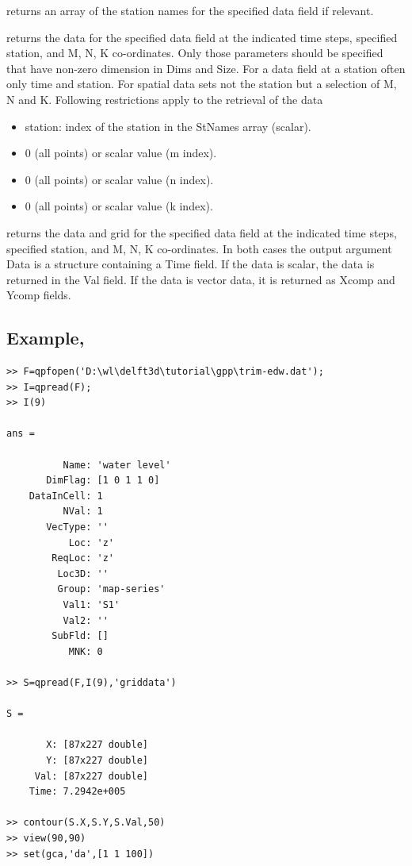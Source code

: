  returns an array of the station names for the specified data field if relevant.

 returns the data for the specified data field at the indicated time steps, specified station, and M, N, K co-ordinates.
Only those parameters should be specified that have non-zero dimension in Dims and Size.
For a data field at a station often only time and station.
For spatial data sets not the station but a selection of M, N and K.
Following restrictions apply to the retrieval of the data

\begin{itemize}
\item station: index of the station in the StNames array (scalar).
\item 0 (all points) or scalar value (m index).
\item 0 (all points) or scalar value (n index).
\item 0 (all points) or scalar value (k index).
\end{itemize}

 returns the data and grid for the specified data field at the indicated time steps, specified station, and M, N, K co-ordinates.
In both cases the output argument Data is a structure containing a Time field.
If the data is scalar, the data is returned in the Val field.
If the data is vector data, it is returned as Xcomp and Ycomp fields.

\subsection*{Example, }
\begin{Verbatim}
>> F=qpfopen('D:\wl\delft3d\tutorial\gpp\trim-edw.dat');
>> I=qpread(F);
>> I(9)

ans =

          Name: 'water level'
       DimFlag: [1 0 1 1 0]
    DataInCell: 1
          NVal: 1
       VecType: ''
           Loc: 'z'
        ReqLoc: 'z'
         Loc3D: ''
         Group: 'map-series'
          Val1: 'S1'
          Val2: ''
        SubFld: []
           MNK: 0

>> S=qpread(F,I(9),'griddata')

S =

       X: [87x227 double]
       Y: [87x227 double]
     Val: [87x227 double]
    Time: 7.2942e+005

>> contour(S.X,S.Y,S.Val,50)
>> view(90,90)
>> set(gca,'da',[1 1 100])
\end{Verbatim}

